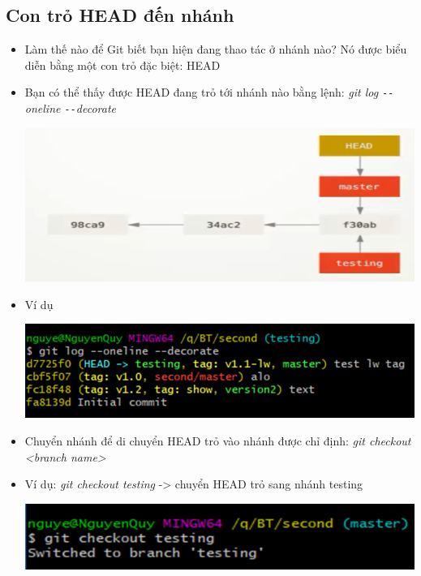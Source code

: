 \documentclass[12pt,a4paper]{report}
\begin{document}
\subsection{Con trỏ HEAD đến nhánh}
\begin{itemize}
\item Làm thế nào để Git biết bạn hiện đang thao tác ở nhánh nào? Nó được biểu diễn bằng một con trỏ đặc biệt: HEAD
\item Bạn có thể thấy được HEAD đang trỏ tới nhánh nào bằng lệnh: {\it git log \texttt{-{}-}oneline \texttt{-{}-}decorate}

	\includegraphics[width=0.8\linewidth]{screenshot052}
	
	\label{fig:screenshot052}

\item Ví dụ

	\includegraphics[width=0.8\linewidth]{screenshot053}
	
	\label{fig:screenshot053}

\item Chuyển nhánh để di chuyển HEAD trỏ vào nhánh được chỉ định: {\it git checkout <branch name>} 
\item Ví dụ: \textit{git checkout testing} -> chuyển HEAD trỏ sang nhánh testing

	\includegraphics[width=0.8\linewidth]{screenshot054}

	\label{fig:screenshot054}

\end{itemize}
\end{document}
